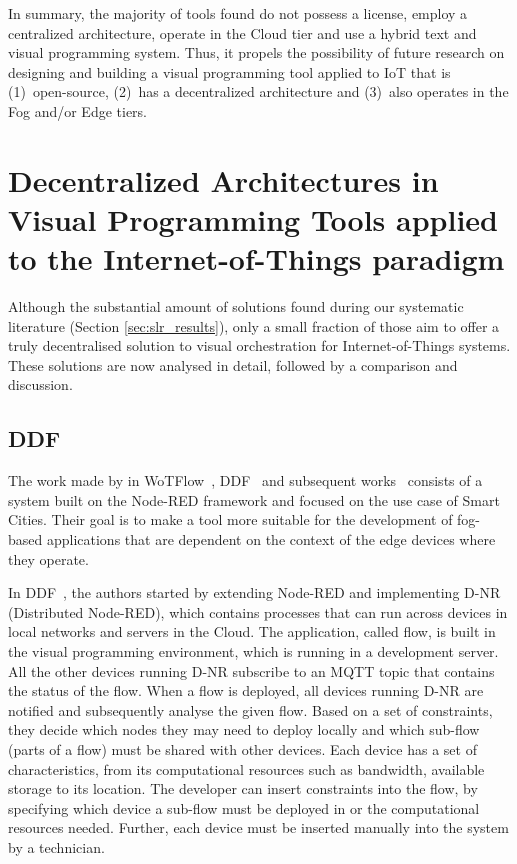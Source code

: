 In summary, the majority of tools found do not possess a license, employ a centralized architecture, operate in the Cloud tier and use a hybrid text and visual programming system. Thus, it propels the possibility of future research on designing and building a visual programming tool applied to IoT that is (1)~open-source, (2)~has a decentralized architecture and (3)~also operates in the Fog and/or Edge tiers.

\section{Decentralized Architectures in Visual Programming Tools applied to the Internet-of-Things paradigm}\label{sec:sota_decentralized}

Although the substantial amount of solutions found during our systematic literature (Section \ref{sec:slr_results}), only a small fraction of those aim to offer a truly decentralised solution to visual orchestration for Internet-of-Things systems. These solutions are now analysed in detail, followed by a comparison and discussion.

\subsection{DDF}\label{sec:decentralized_sota_ddf}

The work made by in WoTFlow~\cite{wotflow_dnr}, DDF~\cite{ddf} and subsequent works~\cite{fog_at_the_edge,exogenous_coordination} consists of a system built on the Node-RED framework and focused on the use case of Smart Cities. Their goal is to make a tool more suitable for the development of fog-based applications that are dependent on the context of the edge devices where they operate. 

In DDF~\cite{ddf}, the authors started by extending Node-RED and implementing D-NR (Distributed Node-RED), which contains processes that can run across devices in local networks and servers in the Cloud. The application, called flow, is built in the visual programming environment, which is running in a development server. All the other devices running D-NR subscribe to an MQTT topic that contains the status of the flow. When a flow is deployed, all devices running D-NR are notified and subsequently analyse the given flow. Based on a set of constraints, they decide which nodes they may need to deploy locally and which sub-flow (parts of a flow) must be shared with other devices. Each device has a set of characteristics, from its computational resources such as bandwidth, available storage to its location. The developer can insert constraints into the flow, by specifying which device a sub-flow must be deployed in or the computational resources needed. Further, each device must be inserted manually into the system by a technician.

